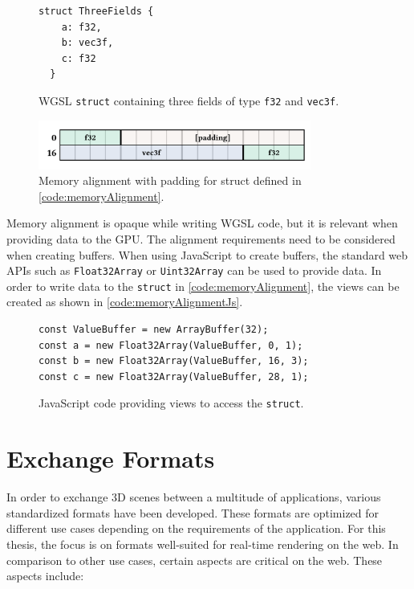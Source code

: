 \begin{figure}[H]
  \begin{lstlisting}[style=wgsl]
  struct ThreeFields {
    a: f32,
    b: vec3f,
    c: f32
  }
  \end{lstlisting}
  \caption{\gls{WGSL} \texttt{struct} containing three fields of type \texttt{f32} and \texttt{vec3f}.}
  \label{code:memoryAlignment}
\end{figure}

\begin{figure}[H]
  \centering
  \includegraphics[width=0.8\textwidth]{resources/memory-alignment.png}
  \caption{Memory alignment with padding for struct defined in \autoref{code:memoryAlignment}.}
  \label{fig:memory-alignment}
\end{figure}

Memory alignment is opaque while writing \gls{WGSL} code, but it is relevant when providing data to the \gls{GPU}. The alignment requirements need to be considered when creating buffers. When using JavaScript to create buffers, the standard web \glspl{API} such as \texttt{Float32Array} or \texttt{Uint32Array} can be used to provide data. In order to write data to the \texttt{struct} in \autoref{code:memoryAlignment}, the views can be created as shown in \autoref{code:memoryAlignmentJs}.

\begin{figure}[H]
  \begin{lstlisting}[style=JavaScript]
const ValueBuffer = new ArrayBuffer(32);
const a = new Float32Array(ValueBuffer, 0, 1);
const b = new Float32Array(ValueBuffer, 16, 3);
const c = new Float32Array(ValueBuffer, 28, 1);
  \end{lstlisting}
  \caption{JavaScript code providing views to access the \texttt{struct}.}
  \label{code:memoryAlignmentJs}
\end{figure}

\section{Exchange Formats}

In order to exchange 3D scenes between a multitude of applications, various standardized formats have been developed. These formats are optimized for different use cases depending on the requirements of the application. For this thesis, the focus is on formats well-suited for real-time rendering on the web. In comparison to other use cases, certain aspects are critical on the web. These aspects include:

